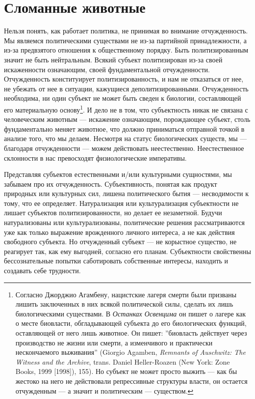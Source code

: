 \documentclass[12pt]{book}
\begin{document}
\section{Сломанные животные}

Нельзя понять, как работает политика, не принимая во внимание отчужденность. Мы являемся политическими существами не из-за партийной принадлежности, а из-за предвзятого отношения к общественному порядку. Быть политизированным значит не быть нейтральным. Всякий субъект политизирован из-за своей искаженности означающим, своей фундаментальной отчужденности. Отчужденность конституирует политизированность, и нам не отказаться от нее, не убежать от нее в ситуации, кажущиеся деполитизированными. Отчужденность необходима, ни один субъект не может быть сведен к биологии, составляющей его материальную основу\footnote{Согласно Джорджио Агамбену, нацистские лагеря смерти были призваны лишить заключенных в них всякой политической силы, сделать их лишь биологическими существами. В \textit{Останках Освенцима} он пишет о лагере как о месте биовласти, обгладывающей субъекта до его биологических функций, оставляющей от него лишь животное. Он пишет: ''биовласть действует через производство не жизни или смерти, а изменчивого и практически нескончаемого выживания'' (Giorgio Agamben, \textit{Remnants of Auschwitz: The Witness and the Archive}, trans. Daniel Heller-Roazen (New York: Zone Books, 1999 [1998]), 155). Но субъект не может просто выжить --- как бы жестоко на него не действовали репрессивные структуры власти, он остается отчужденным --- а значит и политическим --- существом.}. И дело не в том, что субъектность никак не связана с человеческим животным --- искажение означающим, порождающее субъект, столь фундаментально меняет животное, что должно приниматься отправной точкой в анализе того, что мы делаем. Несмотря на статус биологических существ, мы --- благодаря отчужденности --- можем действовать неестественно. Неестественное склонности в нас превосходят физиологические императивы.

Представляя субъектов естественными и/или культурными сущностями, мы забываем про их отчужденность. Субъективность, понятая как продукт природных или культурных сил, лишена политического бытия --- несводимости к тому, что ее определяет. Натурализация или культурализация субъектности не лишает субъектов политизированности, но делает ее незаметной. Будучи натурализованы или культурализованы, политические решения рассматриваются уже как только выражение врожденного личного интереса, а не как действия свободного субъекта. Но отчужденный субъект --- не корыстное существо, не реагирует так, как ему выгодней, согласно его планам. Субъектности свойственны бессознательные попытки саботировать собственные интересы, находить и создавать себе трудности.
\end{document}
